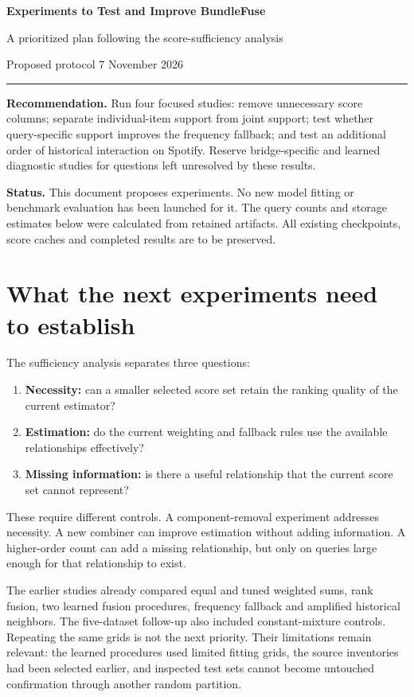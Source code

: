 \documentclass[11pt,a4paper]{article}
\begin{document}
\thispagestyle{plain}
{\Large\bfseries Experiments to Test and Improve BundleFuse\par}
{\large A prioritized plan following the score-sufficiency analysis\par}
{\small Proposed protocol \hfill 7 November 2026\par}
\vspace{3pt}\hrule\vspace{7pt}

\textbf{Recommendation.} Run four focused studies: remove unnecessary score
columns; separate individual-item support from joint support; test whether
query-specific support improves the frequency fallback; and test an additional
order of historical interaction on Spotify. Reserve bridge-specific and
learned diagnostic studies for questions left unresolved by these results.

\textbf{Status.} This document proposes experiments. No new model fitting or
benchmark evaluation has been launched for it. The query counts and storage
estimates below were calculated from retained artifacts. All existing
checkpoints, score caches and completed results are to be preserved.

\section{What the next experiments need to establish}

The sufficiency analysis separates three questions:
\begin{enumerate}
\item \textbf{Necessity:} can a smaller selected score set retain the ranking
quality of the current estimator?
\item \textbf{Estimation:} do the current weighting and fallback rules use
the available relationships effectively?
\item \textbf{Missing information:} is there a useful relationship that the
current score set cannot represent?
\end{enumerate}
These require different controls. A component-removal experiment addresses
necessity. A new combiner can improve estimation without adding information.
A higher-order count can add a missing relationship, but only on queries
large enough for that relationship to exist.

The earlier studies already compared equal and tuned weighted sums,
rank fusion, two learned fusion procedures, frequency fallback and amplified
historical neighbors. The five-dataset follow-up also included constant-mixture
controls. Repeating the same grids is not the next priority. Their limitations
remain relevant: the learned procedures used limited fitting grids, the source
inventories had been selected earlier, and inspected test sets cannot become
untouched confirmation through another random partition.
\end{document}
